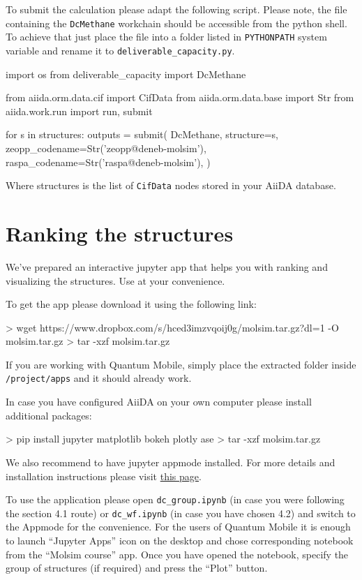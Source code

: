 \documentclass[twoside,a4paper,11pt]{extarticle}
\begin{document}
To submit the calculation please adapt the following script. Please note, the file containing the \verb|DcMethane| workchain should be accessible from the python shell. To achieve that just place the file into a folder listed in \verb|PYTHONPATH| system variable and rename it to  \verb|deliverable_capacity.py|.

\begin{pythoncommand}
import os
from deliverable_capacity import DcMethane

from aiida.orm.data.cif import CifData
from aiida.orm.data.base import Str
from aiida.work.run import run, submit

for s in structures:
    outputs = submit(
        DcMethane,
        structure=s,
        zeopp_codename=Str('zeopp@deneb-molsim'),
        raspa_codename=Str('raspa@deneb-molsim'),
    )
\end{pythoncommand}

Where structures is the list of \verb|CifData| nodes stored in your AiiDA database. 

\section{Ranking the structures}

We've prepared an interactive jupyter app that helps you
with ranking and visualizing the structures.
Use at your convenience.

To get the app please download it using the following link:
\begin{bashcommand}
> wget https://www.dropbox.com/s/hced3imzvqoij0g/molsim.tar.gz?dl=1 -O molsim.tar.gz
> tar -xzf molsim.tar.gz
\end{bashcommand}

If you are working with Quantum Mobile, simply place the extracted folder inside \verb|/project/apps| and it should already work. 

In case you have configured AiiDA on your own computer please install additional packages: 
\begin{bashcommand}
> pip install jupyter matplotlib bokeh plotly ase
> tar -xzf molsim.tar.gz
\end{bashcommand}
We also recommend to have jupyter appmode installed.
For more details and installation instructions please visit \href{https://github.com/oschuett/appmode}{this page}.

To use the application please open \verb|dc_group.ipynb| (in case you were following the section 4.1 route) or \verb|dc_wf.ipynb| (in case you have chosen 4.2) and switch to the Appmode for the convenience. 
For the users of Quantum Mobile it is enough to launch ``Jupyter Apps'' icon on the desktop and chose corresponding notebook from the ``Molsim course'' app.
Once you have opened the notebook,  specify the group of structures (if required) and press the ``Plot'' button. 
\end{document}
